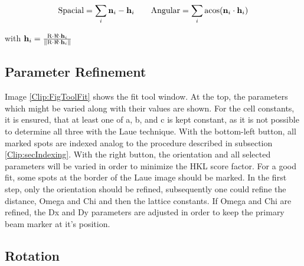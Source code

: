 \begin{displaymath}
\textnormal{Spacial} = \sum_i \mathbf{n}_i - \mathbf{h}_i  \qquad
\textnormal{Angular} = \sum_i \textnormal{acos}(\mathbf{n}_i \cdot \mathbf{h}_i)
\end{displaymath}

with $\mathbf{h}_i = \frac{ \textnormal{R} \cdot \Re \cdot
  \mathbf{h}_i }{ \|  \textnormal{R} \cdot \Re \cdot \mathbf{h}_i \| }
$



\subsection{Parameter Refinement}

Image \ref{Clip:FigToolFit} shows the fit tool window. At the top, the
parameters which might be varied along with their values are shown.
For the cell constants, it is ensured, that at least one of a, b, and
c is kept constant, as it is not possible to determine all three with
the Laue technique. With the bottom-left button, all marked spots are
indexed analog to the procedure described in subsection
\ref{Clip:secIndexing}. With the right button, the orientation and all
selected parameters will be varied in order to minimize the HKL score
factor. For a good fit, some spots at the border of the Laue image
should be marked. In the first step, only the orientation should be
refined, subsequently one could refine the distance, Omega and Chi and
then the lattice constants. If Omega and Chi are refined, the Dx and
Dy parameters are adjusted in order to keep the primary beam marker at
it's position.


\subsection {Rotation}


\label{Clip:SecRotateWindow}

